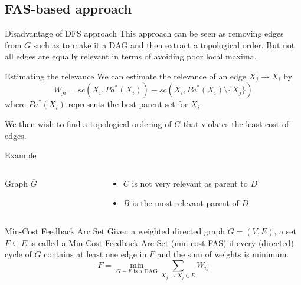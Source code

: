 \subsection{FAS-based approach}
	\begin{frame}
		\begin{block}{Disadvantage of DFS approach}
			This approach can be seen as removing edges from $\overline G$ such as to make it a DAG and then extract a topological order. But not all edges are \alert{equally relevant} in terms of avoiding poor local maxima.
		\end{block}		
	\end{frame}
	
	\begin{frame}
		\begin{block}{Estimating the relevance}
			We can estimate the relevance of an edge $X_j \rightarrow X_i$ by
			\[ W_{ji} = {sc}( X_i , {Pa}^*( X_i ) ) - {sc}( X_i , {Pa}^*( X_i ) \setminus \{ X_j \} ) \]
			where ${Pa}^*( X_i )$ represents the \alert{best parent set} for $X_i$.\\
		\end{block}
		We then wish to find a topological ordering of $\overline G$ that violates the least cost of edges.
	\end{frame}
	
	\begin{frame}{Example}
		\begin{columns}
			\begin{column}{.4\textwidth}
				\begin{figure}
					\centering
					
				\end{figure}
				\centering
				Graph $\overline G$
			\end{column}
			\begin{column}{.5\textwidth}
				\begin{itemize}
					\item $C$ is not very relevant as parent to $D$
					\item $B$ is the most relevant parent of $D$
				\end{itemize}
			\end{column}
		\end{columns}
	\end{frame}
	
	\begin{frame}
		\begin{block}{Min-Cost Feedback Arc Set}
			 Given a weighted directed graph $G = ( V , E )$, a set $F \subseteq E$ is called a Min-Cost Feedback Arc Set (min-cost FAS) if every (directed) cycle of $G$ contains at least one edge in $F$ and the sum of weights is minimum.
				\[ F = \min_{G-F \text{ is a DAG}} \sum_{X_j \rightarrow X_j \in E} W_{ij} \]
		\end{block}
	\end{frame}
	
